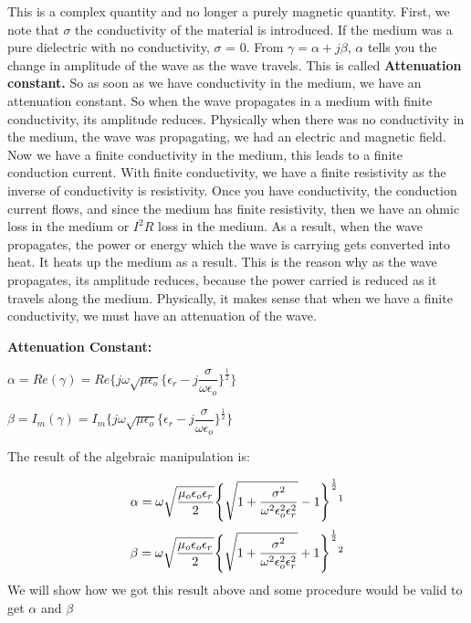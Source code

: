 This is a complex quantity and no longer a purely magnetic quantity. First, we note that $\sigma$ the conductivity of the material is introduced. If the medium was a pure dielectric with no conductivity, $\sigma$ = 0. From $\gamma = \alpha + j\beta$, $\alpha$ tells you the change in amplitude of the wave as the wave travels. This is called \textbf{Attenuation constant.} So as soon as we have conductivity in the medium, we have an attenuation constant. So when the wave propagates in a medium with finite conductivity, its amplitude reduces. Physically when there was no conductivity in the medium, the wave was propagating, we had an electric and magnetic field. Now we have a finite conductivity in the medium, this leads to a finite conduction current. With finite conductivity, we have a finite resistivity as the inverse of conductivity is resistivity. Once you have conductivity, the conduction current flows, and since the medium has finite resistivity, then we have an ohmic loss in the medium or $I^2 R$ loss in the medium. As a result, when the wave propagates, the power or energy which the wave is carrying gets converted into heat. It heats up the medium as a result. This is the reason why as the wave propagates, its amplitude reduces, because the power carried is reduced as it travels along the medium. Physically, it makes sense that when we have a finite conductivity, we must have an attenuation of the wave. 

\textbf{Attenuation Constant:}
\begin{center}
$\alpha = Re(\gamma) = Re\Bigg\{j\omega\sqrt{\mu\epsilon_{o}}\bigg\{\epsilon_{r} - j\dfrac{\sigma}{\omega\epsilon_{o}}\bigg\}^{\frac{1}{2}}\Bigg\}$
\end{center}

\begin{center}
$\beta = I_{m}(\gamma) = I_{m}\Bigg\{j\omega\sqrt{\mu\epsilon_{o}}\bigg\{\epsilon_{r} - j\dfrac{\sigma}{\omega\epsilon_{o}}\bigg\}^{\frac{1}{2}}\Bigg\}$
\end{center}

The result of the algebraic manipulation is:

\begin{equation}
\alpha = \omega\sqrt{\dfrac{\mu_{o}\epsilon_{o}\epsilon_{r}}{2}}\Bigg\{{\sqrt{1 + \dfrac{\sigma^{2}}{\omega^{2}\epsilon_{o}^{2}\epsilon_{r}^{2}}}} - 1\Bigg\}^{\frac{1}{2}}\footnotemark
\end{equation}
\begin{equation}
\beta = \omega\sqrt{\dfrac{\mu_{o}\epsilon_{o}\epsilon_{r}}{2}}\Bigg\{{\sqrt{1 + \dfrac{\sigma^{2}}{\omega^{2}\epsilon_{o}^{2}\epsilon_{r}^{2}}}} + 1\Bigg\}^{\frac{1}{2}}\footnotemark
\end{equation}
We will show how we got this result above and some procedure would be valid to get $\alpha$ and $\beta$

